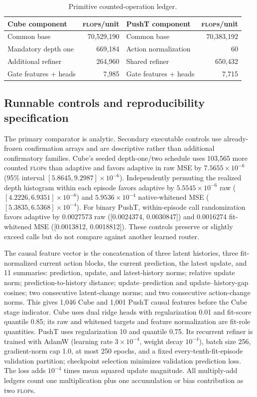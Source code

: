 \documentclass{article}
\newcommand{\flops}{\textsc{flop}s}
\begin{document}
\begin{table}[h]
\centering
\caption{Primitive counted-operation ledger.}
\label{tab:operations}
\footnotesize
\begin{tabularx}{\textwidth}{@{}Y r Y r@{}}
\toprule
Cube component & \flops{}/unit & PushT component & \flops{}/unit \\
\midrule
Common base & 70,529,190 & Common base & 70,383,192 \\
Mandatory depth one & 669,184 & Action normalization & 60 \\
Additional refiner & 264,960 & Shared refiner & 650,432 \\
Gate features + heads & 7,985 & Gate features + heads & 7,715 \\
\bottomrule
\end{tabularx}
\end{table}

\subsection{Runnable controls and reproducibility specification}
\label{app:controls}

The primary comparator is analytic. Secondary executable controls use already-frozen confirmation arrays and are descriptive rather than additional confirmatory families. Cube's seeded depth-one/two schedule uses 103,565 more counted \flops{} than adaptive and favors adaptive in raw MSE by \(7.5655\times10^{-6}\) (95\% interval \([5.8645,9.2987]\times10^{-6}\)). Independently permuting the realized depth histogram within each episode favors adaptive by \(5.5545\times10^{-6}\) raw (\([4.2226,6.9351]\times10^{-6}\)) and \(5.9536\times10^{-4}\) native-whitened MSE (\([5.3835,6.5368]\times10^{-4}\)). For binary PushT, within-episode call randomization favors adaptive by 0.0027573 raw ([0.0024374, 0.0030847]) and 0.0016274 fit-whitened MSE ([0.0013812, 0.0018812]). These controls preserve or slightly exceed calls but do not compare against another learned router.

The causal feature vector is the concatenation of three latent histories, three fit-normalized current action blocks, the current prediction, the latest update, and 11 summaries: prediction, update, and latest-history norms; relative update norm; prediction-to-history distance; update--prediction and update--history-gap cosines; two consecutive latent-change norms; and two consecutive action-change norms. This gives 1,046 Cube and 1,001 PushT causal features before the Cube stage indicator. Cube uses dual ridge heads with regularization 0.01 and fit-score quantile 0.85; its raw and whitened targets and feature normalization are fit-role quantities. PushT uses regularization 10 and quantile 0.75. Its recurrent refiner is trained with AdamW (learning rate \(3\times10^{-4}\), weight decay \(10^{-4}\)), batch size 256, gradient-norm cap 1.0, at most 250 epochs, and a fixed every-tenth-fit-episode validation partition; checkpoint selection minimizes validation prediction loss. The loss adds \(10^{-4}\) times mean squared update magnitude. All multiply-add ledgers count one multiplication plus one accumulation or bias contribution as two \flops{}.
\end{document}
